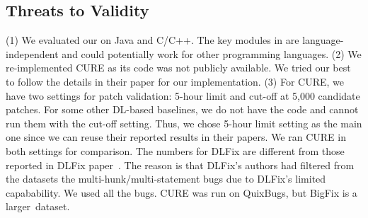 \subsection{Threats to Validity}




(1) We evaluated our {\tool} on Java and C/C++.  The key modules in
{\tool} are language-independent and could potentially work for other
programming languages. (2) We re-implemented CURE as its code was not
publicly available.
We tried our best to follow the details in their paper for our
implementation.
(3) For CURE, we have two settings for patch validation: 5-hour limit
and cut-off at 5,000 candidate patches. For some other DL-based
baselines, we do not have the code and cannot run them with the
cut-off setting. Thus, we chose 5-hour limit setting as the main one
since we can reuse their reported results in their papers. We ran
CURE in both settings for comparison.
The numbers for DLFix are different from those reported in DLFix
paper~\cite{icse20}. The reason is that DLFix's authors had filtered
from the datasets the multi-hunk/multi-statement bugs due to DLFix's
limited capabability. We used all the bugs. CURE was run on QuixBugs,
but BigFix is a larger~dataset.




